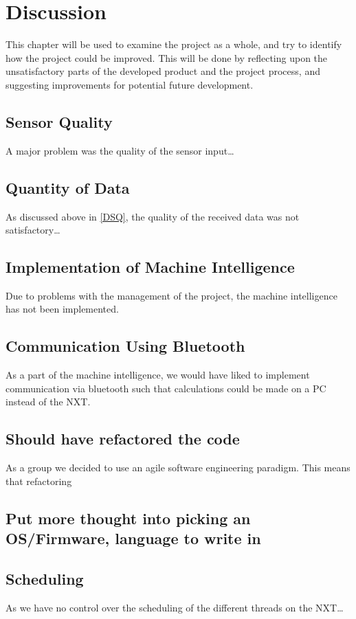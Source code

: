 \chapter{Discussion}\label{projDiscus}
This chapter will be used to examine the project as a whole, and try to identify
how the project could be improved. This will be done by reflecting upon the
unsatisfactory parts of the developed product and the project process, and
suggesting improvements for potential future development.

\section{Sensor Quality}\label{DSQ}
A major problem was the quality of the sensor input\ldots

\section{Quantity of Data}
As discussed above in \autoref{DSQ}, the quality of the received data was not
satisfactory\ldots

\section{Implementation of Machine Intelligence}
Due to problems with the management of the project, the machine intelligence has
not been implemented.

\section{Communication Using Bluetooth}
As a part of the machine intelligence, we would have liked to implement
communication via bluetooth such that calculations could be made on a PC instead
of the NXT.

\section{Should have refactored the code}
As a group we decided to use an agile software engineering paradigm. This means that
refactoring
\section{Put more thought into picking an OS/Firmware, language to write in}

\section{Scheduling}
As we have no control over the scheduling of the different threads on the NXT\ldots

